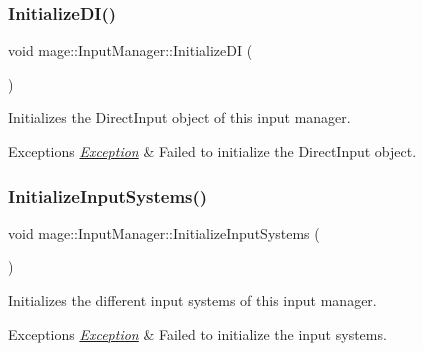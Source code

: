 \subsubsection{\texorpdfstring{Initialize\+D\+I()}{InitializeDI()}}
{\footnotesize\ttfamily void mage\+::\+Input\+Manager\+::\+Initialize\+DI (\begin{DoxyParamCaption}{ }\end{DoxyParamCaption})\hspace{0.3cm}{\ttfamily [private]}}

Initializes the Direct\+Input object of this input manager.


\begin{DoxyExceptions}{Exceptions}
{\em \hyperlink{classmage_1_1_exception}{Exception}} & Failed to initialize the Direct\+Input object. \\
\hline
\end{DoxyExceptions}
\hypertarget{classmage_1_1_input_manager_a73ec320ef9f3809f092b98da50f99840}{}\label{classmage_1_1_input_manager_a73ec320ef9f3809f092b98da50f99840} 
\subsubsection{\texorpdfstring{Initialize\+Input\+Systems()}{InitializeInputSystems()}}
{\footnotesize\ttfamily void mage\+::\+Input\+Manager\+::\+Initialize\+Input\+Systems (\begin{DoxyParamCaption}{ }\end{DoxyParamCaption})\hspace{0.3cm}{\ttfamily [private]}}

Initializes the different input systems of this input manager.


\begin{DoxyExceptions}{Exceptions}
{\em \hyperlink{classmage_1_1_exception}{Exception}} & Failed to initialize the input systems. \\
\hline
\end{DoxyExceptions}
\hypertarget{classmage_1_1_input_manager_af274778a476cc52758f7083b6f74ea34}{}\label{classmage_1_1_input_manager_af274778a476cc52758f7083b6f74ea34} 
